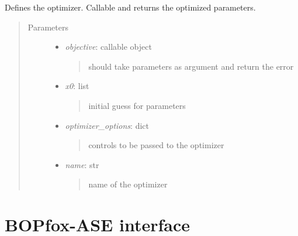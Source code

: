 \documentclass[letterpaper,10pt,english]{sphinxmanual}
\begin{document}
\begin{fulllineitems}
\label{classes:catkernel.CAToptimizer}
Defines the optimizer. Callable and returns the optimized parameters.
\begin{quote}\begin{description}
\item[{Parameters}] \leavevmode\begin{itemize}
\item {} 
\emph{objective}: callable object
\begin{quote}

should take parameters as argument and return the error
\end{quote}

\item {} 
\emph{x0}: list
\begin{quote}

initial guess for parameters
\end{quote}

\item {} 
\emph{optimizer\_options}: dict
\begin{quote}

controls to be passed to the optimizer
\end{quote}

\item {} 
\emph{name}: str
\begin{quote}

name of the optimizer
\end{quote}

\end{itemize}

\end{description}\end{quote}

\end{fulllineitems}



\section{BOPfox-ASE interface}
\label{classes:module-bopcal}\label{classes:bopfox-ase-interface}
\end{document}
